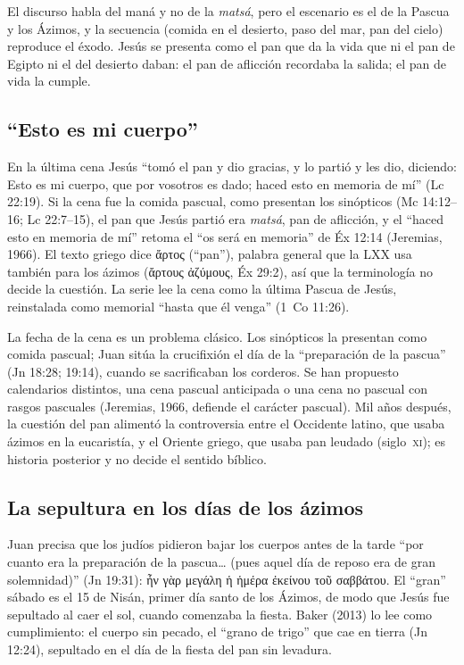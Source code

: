 \documentclass[11pt,letterpaper]{article}
\newcommand{\grc}[1]{\foreignlanguage{ancientgreek}{#1}}
\begin{document}
El discurso habla del maná y no de la \emph{matsá}, pero el escenario es el de la Pascua y los Ázimos, y la secuencia (comida en el desierto, paso del mar, pan del cielo) reproduce el éxodo. Jesús se presenta como el pan que da la vida que ni el pan de Egipto ni el del desierto daban: el pan de aflicción recordaba la salida; el pan de vida la cumple.

\subsection{``Esto es mi cuerpo''}
En la última cena Jesús ``tomó el pan y dio gracias, y lo partió y les dio, diciendo: Esto es mi cuerpo, que por vosotros es dado; haced esto en memoria de mí'' (Lc 22:19). Si la cena fue la comida pascual, como presentan los sinópticos (Mc 14:12--16; Lc 22:7--15), el pan que Jesús partió era \emph{matsá}, pan de aflicción, y el ``haced esto en memoria de mí'' retoma el ``os será en memoria'' de Éx 12:14 (Jeremias, 1966). El texto griego dice \grc{ἄρτος} (``pan''), palabra general que la LXX usa también para los ázimos (\grc{ἄρτους ἀζύμους}, Éx 29:2), así que la terminología no decide la cuestión. La serie lee la cena como la última Pascua de Jesús, reinstalada como memorial ``hasta que él venga'' (1~Co 11:26).

\begin{nota}[Precisión]
La fecha de la cena es un problema clásico. Los sinópticos la presentan como comida pascual; Juan sitúa la crucifixión el día de la ``preparación de la pascua'' (Jn 18:28; 19:14), cuando se sacrificaban los corderos. Se han propuesto calendarios distintos, una cena pascual anticipada o una cena no pascual con rasgos pascuales (Jeremias, 1966, defiende el carácter pascual). Mil años después, la cuestión del pan alimentó la controversia entre el Occidente latino, que usaba ázimos en la eucaristía, y el Oriente griego, que usaba pan leudado (siglo~\textsc{xi}); es historia posterior y no decide el sentido bíblico.
\end{nota}

\subsection{La sepultura en los días de los ázimos}
Juan precisa que los judíos pidieron bajar los cuerpos antes de la tarde ``por cuanto era la preparación de la pascua\ldots{} (pues aquel día de reposo era de gran solemnidad)'' (Jn 19:31): \grc{ἦν γὰρ μεγάλη ἡ ἡμέρα ἐκείνου τοῦ σαββάτου}. El ``gran'' sábado es el 15 de Nisán, primer día santo de los Ázimos, de modo que Jesús fue sepultado al caer el sol, cuando comenzaba la fiesta. Baker (2013) lo lee como cumplimiento: el cuerpo sin pecado, el ``grano de trigo'' que cae en tierra (Jn 12:24), sepultado en el día de la fiesta del pan sin levadura.
\end{document}
